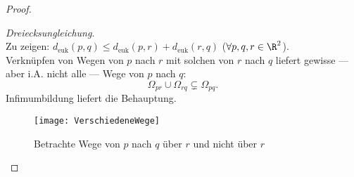 \begin{theorem}
\begin{proof}
\begin{itemize}
      \begin{minipage}{.45\textwidth}
        \item \emph{Dreiecksungleichung}. \\
          Zu zeigen: \( d_\text{euk}(p,q) \leq d_\text{euk}(p,r) + d_\text{euk}(r,q) \) (\( \forall p, q, r \in \R^2 \)). \\
          Verknüpfen von Wegen von \( p \) nach \( r \) mit solchen von \( r \) nach \( q \) liefert gewisse --- aber i.A. nicht alle --- Wege von \( p \) nach \( q \):
          \begin{equation*}
            \Omega_{pr} \cup \Omega_{rq} \subsetneq \Omega_{pq}\text{.}
          \end{equation*}
          Infimumbildung liefert die Behauptung.
      \end{minipage}
      \hfill
      \begin{minipage}{.45\textwidth}
        \begin{figure}[H]
          \texttt{[image: VerschiedeneWege]}
          \caption{Betrachte Wege von \( p \) nach \( q \) über \( r \) und nicht über \( r \)}
        \end{figure}
      \end{minipage}


\end{itemize}
\end{proof}
\end{theorem}

